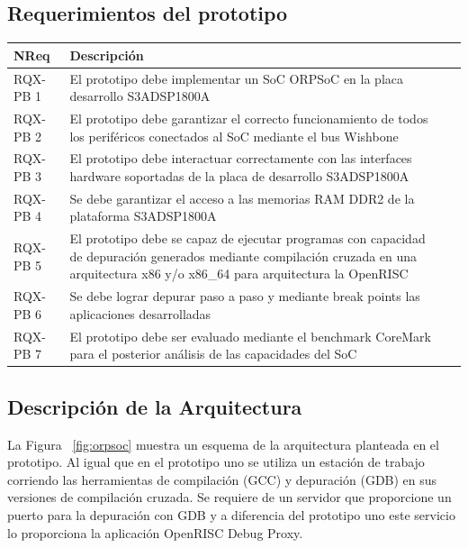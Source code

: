 		\subsection{Requerimientos del prototipo}
		\begin{table}[h!]
		\centering
		\begin{tabular}{ p{2.5cm} p{8cm} p{3cm} }
		\hline 
		\rowcolor[gray]{0.8} N\textordmasculine Req & Descripción\\
		\hline 
		RQX-PB 1 & El prototipo debe implementar un SoC ORPSoC en la placa desarrollo S3ADSP1800A\\ 
		\hline 
		RQX-PB 2 & El prototipo debe garantizar el correcto funcionamiento de todos los periféricos conectados al SoC mediante el bus Wishbone\\ 
		\hline 
		RQX-PB 3 & El prototipo debe interactuar correctamente con las interfaces hardware soportadas de la placa de desarrollo S3ADSP1800A\\ 
		\hline
		RQX-PB 4 & Se debe garantizar el acceso a las memorias RAM DDR2 de la plataforma S3ADSP1800A\\
		\hline
		RQX-PB 5 & El prototipo debe se capaz de ejecutar programas con capacidad de depuración generados mediante compilación
		cruzada en una arquitectura x86 y/o x86\_64 para arquitectura la OpenRISC\\
		\hline
		RQX-PB 6 & Se debe lograr depurar paso a paso y mediante break points las aplicaciones desarrolladas\\
		\hline
		RQX-PB 7 & El prototipo debe ser evaluado mediante el benchmark CoreMark para el posterior análisis de las capacidades del SoC\\
		\hline		
		\end{tabular}
		\end{table}

		\subsection{Descripción de la Arquitectura}
		La Figura ~\ref{fig:orpsoc} muestra un esquema de la arquitectura planteada en el prototipo. Al igual que en el prototipo uno se utiliza un estación
		de trabajo corriendo las herramientas de compilación (GCC) y depuración (GDB) en sus versiones de compilación cruzada. Se requiere de un servidor
		que proporcione un puerto para la depuración con GDB y a diferencia del prototipo uno este servicio lo proporciona la aplicación OpenRISC Debug
		Proxy.
		
